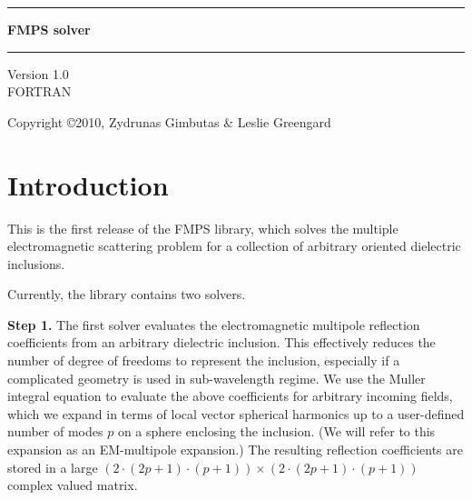 \documentclass{article}
\begin{document}
\begin{titlepage}
\vskip 36pt
\begin{center}

\hrule
\vspace{ .2 in}
{\Huge {\bf FMPS solver} }
\vspace{ .14 in}
\hrule
\vspace{ .44 in}
{\huge Version 1.0} \\
\vspace{ .24 in}
{\huge FORTRAN } \\
\vspace{ .24 in}

\end{center}


\vfill
Copyright \copyright 2010, Zydrunas Gimbutas \& Leslie Greengard 

\end{titlepage}

\section{Introduction}

This is the first release of the FMPS library, which solves the
multiple electromagnetic scattering problem for a collection of
arbitrary oriented dielectric inclusions.

Currently, the library contains two solvers. 

{\bf Step 1.} \hspace{1in} The first solver
evaluates the electromagnetic multipole reflection coefficients from
an arbitrary dielectric inclusion. This effectively reduces the number
of degree of freedoms to represent the inclusion, especially if a
complicated geometry is used in sub-wavelength regime. We use the Muller
integral equation to evaluate the above coefficients for arbitrary
incoming fields, which we expand in terms of local vector spherical harmonics
up to a user-defined number of modes $p$ on a sphere enclosing the 
inclusion. (We will refer to this expansion as an EM-multipole expansion.)
The resulting reflection coefficients are stored in a large
$ (2\cdot(2p+1)\cdot(p+1)) \times (2\cdot (2 p+1)\cdot (p+1))$ complex
valued matrix. 
\end{document}
